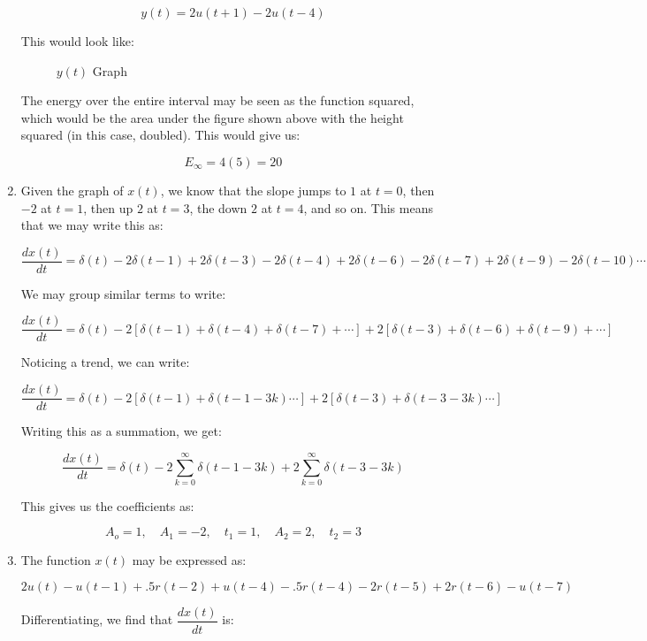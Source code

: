 \begin{enumerate}
      \vspace{-15pt}

      $$y(t)=2u(t+1)-2u(t-4)$$

      This would look like:

      \begin{figure}[H]
        \centering
        
        \caption{$y(t)$ Graph}
        \label{fig:5}
      \end{figure}

      The energy over the entire interval may be seen as the function squared, which would be the area under the figure shown above with the height squared (in this case, doubled). This would give us:

      $$\boxed{E_{\infty}=4(5)=20}$$

  \item

    Given the graph of $x(t)$, we know that the slope jumps to $1$ at $t=0$, then $-2$ at $t=1$, then up $2$ at $t=3$, the down $2$ at $t=4$, and so on. This means that we may write this as:

    $$\frac{dx(t)}{dt}=\delta(t)-2\delta(t-1)+2\delta(t-3)-2\delta(t-4)+2\delta(t-6)-2\delta(t-7)+2\delta(t-9)-2\delta(t-10)\cdots$$

    We may group similar terms to write:

    $$\frac{dx(t)}{dt}=\delta(t)-2[\delta(t-1)+\delta(t-4)+\delta(t-7)+\cdots]+2[\delta(t-3)+\delta(t-6)+\delta(t-9)+\cdots]$$

     Noticing a trend, we can write:

    $$\frac{dx(t)}{dt}=\delta(t)-2[\delta(t-1)+\delta(t-1-3k)\cdots]+2[\delta(t-3)+\delta(t-3-3k)\cdots]$$

    Writing this as a summation, we get:

    $$\frac{dx(t)}{dt}=\delta(t)-2\sum_{k=0}^{\infty}\delta(t-1-3k)+2\sum_{k=0}^{\infty}\delta(t-3-3k)$$

    This gives us the coefficients as:

    $$\boxed{A_o=1,\quad A_1=-2,\quad t_1=1,\quad A_2=2,\quad t_2=3}$$

  \item

    The function $x(t)$ may be expressed as:

    $$\boxed{2u(t)-u(t-1)+.5r(t-2)+u(t-4)-.5r(t-4)-2r(t-5)+2r(t-6)-u(t-7)}$$

    Differentiating, we find that $\dfrac{dx(t)}{dt}$ is:


\end{enumerate}
